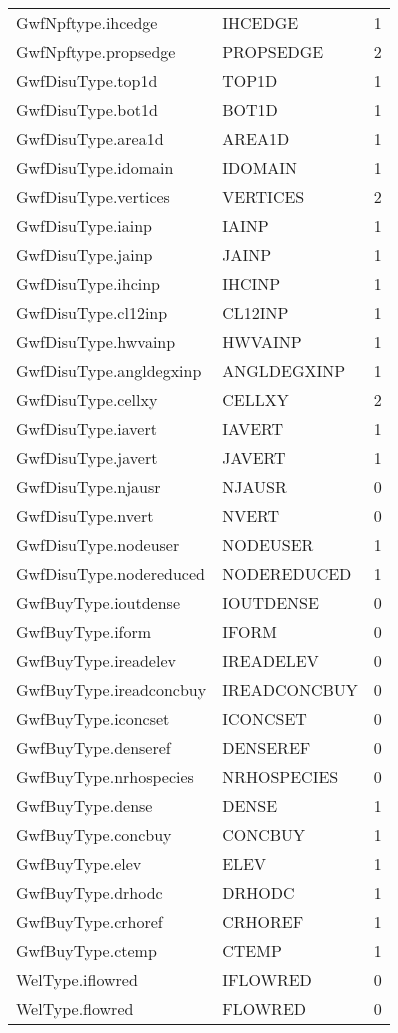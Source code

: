 \begin{longtable}{p{6cm} p{4cm} p{2cm} }
GwfNpftype.ihcedge &  IHCEDGE & 1 \\ 
GwfNpftype.propsedge &  PROPSEDGE & 2 \\ 
GwfDisuType.top1d &  TOP1D & 1 \\ 
GwfDisuType.bot1d &  BOT1D & 1 \\ 
GwfDisuType.area1d &  AREA1D & 1 \\ 
GwfDisuType.idomain &  IDOMAIN & 1 \\ 
GwfDisuType.vertices &  VERTICES & 2 \\ 
GwfDisuType.iainp &  IAINP & 1 \\ 
GwfDisuType.jainp &  JAINP & 1 \\ 
GwfDisuType.ihcinp &  IHCINP & 1 \\ 
GwfDisuType.cl12inp &  CL12INP & 1 \\ 
GwfDisuType.hwvainp &  HWVAINP & 1 \\ 
GwfDisuType.angldegxinp &  ANGLDEGXINP & 1 \\ 
GwfDisuType.cellxy &  CELLXY & 2 \\ 
GwfDisuType.iavert &  IAVERT & 1 \\ 
GwfDisuType.javert &  JAVERT & 1 \\ 
GwfDisuType.njausr &  NJAUSR & 0 \\ 
GwfDisuType.nvert &  NVERT & 0 \\ 
GwfDisuType.nodeuser &  NODEUSER & 1 \\ 
GwfDisuType.nodereduced &  NODEREDUCED & 1 \\ 
GwfBuyType.ioutdense &  IOUTDENSE & 0 \\ 
GwfBuyType.iform &  IFORM & 0 \\ 
GwfBuyType.ireadelev &  IREADELEV & 0 \\ 
GwfBuyType.ireadconcbuy &  IREADCONCBUY & 0 \\ 
GwfBuyType.iconcset &  ICONCSET & 0 \\ 
GwfBuyType.denseref &  DENSEREF & 0 \\ 
GwfBuyType.nrhospecies &  NRHOSPECIES & 0 \\ 
GwfBuyType.dense &  DENSE & 1 \\ 
GwfBuyType.concbuy &  CONCBUY & 1 \\ 
GwfBuyType.elev &  ELEV & 1 \\ 
GwfBuyType.drhodc &  DRHODC & 1 \\ 
GwfBuyType.crhoref &  CRHOREF & 1 \\ 
GwfBuyType.ctemp &  CTEMP & 1 \\ 
WelType.iflowred &  IFLOWRED & 0 \\ 
WelType.flowred &  FLOWRED & 0 \\ 


\hline
\end{longtable}
\label{table:blocks}
\normalsize

